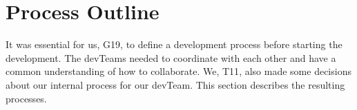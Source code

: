 \chapter{Process Outline}

It was essential for us, \gls{G19}, to define a development process before starting the development. The \glspl{devTeam} needed to coordinate with each other and have a common understanding of how to collaborate. We, \gls{T11}, also made some decisions about our internal process for our \gls{devTeam}. This section describes the resulting processes.
